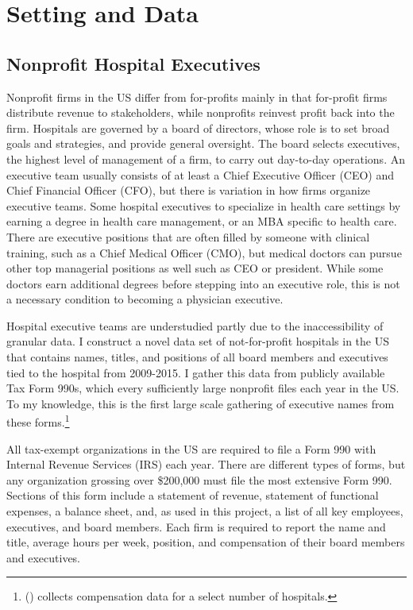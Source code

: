 \documentclass[12pt]{article}
\begin{document}
    \section{Setting and Data}

    \subsection{Nonprofit Hospital Executives}

    Nonprofit firms in the US differ from for-profits mainly in that for-profit firms distribute revenue to stakeholders, while nonprofits reinvest profit back into the firm. Hospitals are governed by a board of directors, whose role is to set broad goals and strategies, and provide general oversight. The board selects executives, the highest level of management of a firm, to carry out day-to-day operations. An executive team usually consists of at least a Chief Executive Officer (CEO) and Chief Financial Officer (CFO), but there is variation in how firms organize executive teams. Some hospital executives to specialize in health care settings by earning a degree in health care management, or an MBA specific to health care. There are executive positions that are often filled by someone with clinical training, such as a Chief Medical Officer (CMO), but medical doctors can pursue other top managerial positions as well such as CEO or president. While some doctors earn additional degrees before stepping into an executive role, this is not a necessary condition to becoming a physician executive. 

    Hospital executive teams are understudied partly due to the inaccessibility of granular data. I construct a novel data set of not-for-profit hospitals in the US that contains names, titles, and positions of all board members and executives tied to the hospital from 2009-2015. I gather this data from publicly available Tax Form 990s, which every sufficiently large nonprofit files each year in the US. To my knowledge, this is the first large scale gathering of executive names from these forms.\footnote{\citeauthor{brickley2010board} (\citeyear{brickley2010board}) collects compensation data for a select number of hospitals.} 

    All tax-exempt organizations in the US are required to file a Form 990 with Internal Revenue Services (IRS) each year. There are different types of forms, but any organization grossing over \$200,000 must file the most extensive Form 990. Sections of this form include a statement of revenue, statement of functional expenses, a balance sheet, and, as used in this project, a list of all key employees, executives, and board members. Each firm is required to report the name and title, average hours per week, position, and compensation of their board members and executives. 
\end{document}
